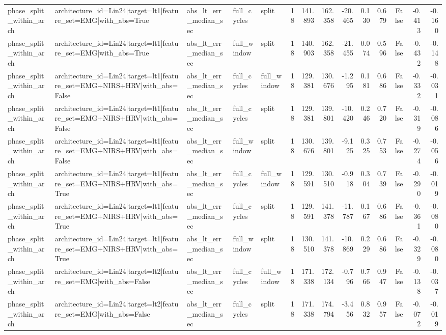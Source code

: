 \begin{table}
\begin{tabular}{lllllrrrrrrrrr}
phase_split_within_arch & architecture_id=Lin24|target=lt1|feature_set=EMG|with_abs=True & abs_lt_err_median_sec & full_cycles & split & 18 & 141.893 & 162.358 & -20.465 & 0.130 & 0.679 & False & -0.413 & -0.160 \\
phase_split_within_arch & architecture_id=Lin24|target=lt1|feature_set=EMG|with_abs=True & abs_lt_err_median_sec & full_window & split & 18 & 140.903 & 162.358 & -21.455 & 0.074 & 0.596 & False & -0.432 & -0.148 \\
phase_split_within_arch & architecture_id=Lin24|target=lt1|feature_set=EMG+NIRS+HRV|with_abs=False & abs_lt_err_median_sec & full_cycles & full_window & 18 & 129.381 & 130.676 & -1.295 & 0.181 & 0.686 & False & -0.332 & -0.031 \\
phase_split_within_arch & architecture_id=Lin24|target=lt1|feature_set=EMG+NIRS+HRV|with_abs=False & abs_lt_err_median_sec & full_cycles & split & 18 & 129.381 & 139.801 & -10.420 & 0.246 & 0.720 & False & -0.319 & -0.086 \\
phase_split_within_arch & architecture_id=Lin24|target=lt1|feature_set=EMG+NIRS+HRV|with_abs=False & abs_lt_err_median_sec & full_window & split & 18 & 130.676 & 139.801 & -9.125 & 0.325 & 0.753 & False & -0.274 & -0.056 \\
phase_split_within_arch & architecture_id=Lin24|target=lt1|feature_set=EMG+NIRS+HRV|with_abs=True & abs_lt_err_median_sec & full_cycles & full_window & 18 & 129.591 & 130.510 & -0.918 & 0.304 & 0.739 & False & -0.290 & -0.019 \\
phase_split_within_arch & architecture_id=Lin24|target=lt1|feature_set=EMG+NIRS+HRV|with_abs=True & abs_lt_err_median_sec & full_cycles & split & 18 & 129.591 & 141.378 & -11.787 & 0.167 & 0.686 & False & -0.361 & -0.080 \\
phase_split_within_arch & architecture_id=Lin24|target=lt1|feature_set=EMG+NIRS+HRV|with_abs=True & abs_lt_err_median_sec & full_window & split & 18 & 130.510 & 141.378 & -10.869 & 0.229 & 0.686 & False & -0.329 & -0.080 \\
phase_split_within_arch & architecture_id=Lin24|target=lt2|feature_set=EMG|with_abs=False & abs_lt_err_median_sec & full_cycles & full_window & 18 & 171.338 & 172.134 & -0.796 & 0.766 & 0.947 & False & -0.138 & -0.037 \\
phase_split_within_arch & architecture_id=Lin24|target=lt2|feature_set=EMG|with_abs=False & abs_lt_err_median_sec & full_cycles & split & 18 & 171.338 & 174.794 & -3.456 & 0.832 & 0.957 & False & -0.072 & -0.019 \\

\end{tabular}
\end{table}
